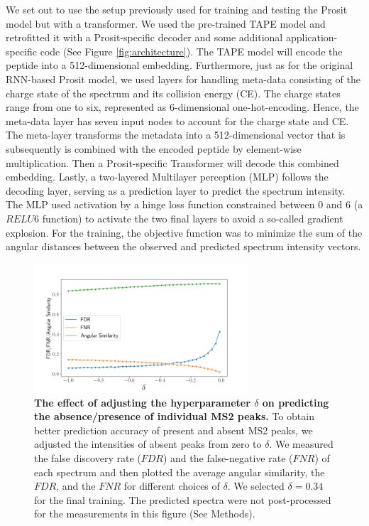 \documentclass[10pt,a4paper]{article}
\begin{document}
We set out to use the setup previously used for training and testing the Prosit model but with a transformer. We used the pre-trained TAPE model \cite{Rao2019-qq} and retrofitted it with a Prosit-specific decoder and some additional application-specific code (See Figure \ref{fig:architecture}). The TAPE model will encode the peptide into a 512-dimensional embedding. Furthermore, just as for the original RNN-based Prosit model, we used layers for handling meta-data consisting of the charge state of the spectrum and its collision energy (CE). The charge states range from one to six, represented as 6-dimensional one-hot-encoding. Hence, the meta-data layer has seven input nodes to account for the charge state and CE. The meta-layer transforms the metadata into a 512-dimensional vector that is subsequently is combined with the encoded peptide by element-wise multiplication. Then a Prosit-specific Transformer will decode this combined embedding. Lastly, a two-layered Multilayer perception (MLP) follows the decoding layer, serving as a prediction layer to predict the spectrum intensity. The MLP used activation by a hinge loss function constrained between 0 and 6 (a $\textit{RELU6}$ function) to activate the two final layers to avoid a so-called gradient explosion. For the training, the objective function was to minimize the sum of the angular distances between the observed and predicted spectrum intensity vectors.


\begin{figure}[htb!]
    \centering
    \includegraphics[width=8cm]{./img/compare_delta.png}
    \caption{{\bf The effect of adjusting the hyperparameter $\delta$ on predicting the absence/presence of individual MS2 peaks.} To obtain better prediction accuracy of present and absent MS2 peaks, we adjusted the intensities of absent peaks from zero to $\delta$. We measured the false discovery rate ($\mathit{FDR}$) and the false-negative rate ($\mathit{FNR}$) of each spectrum and then plotted the average angular similarity, the $\mathit{FDR}$, and the $\mathit{FNR}$ for different choices of $\delta$. We selected $\delta=0.34$ for the final training.  The predicted spectra were not post-processed for the measurements in this figure (See Methods). \label{fig:delta}}
\end{figure}
    
\end{document}
